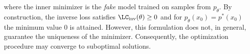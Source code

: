   where the inner minimizer is the \emph{fake} model trained on samples from $p_\theta$. 
  By construction, the inverse loss satisfies $\LC_{\text{inv}}(\theta) \geq 0$ and for $p_\theta(x_0) = p^*(x_0)$ the minimum value $0$ is attained. However, this formulation does not, in general, guarantee the uniqueness of the minimizer. Consequently, the optimization procedure may converge to suboptimal solutions.

  
